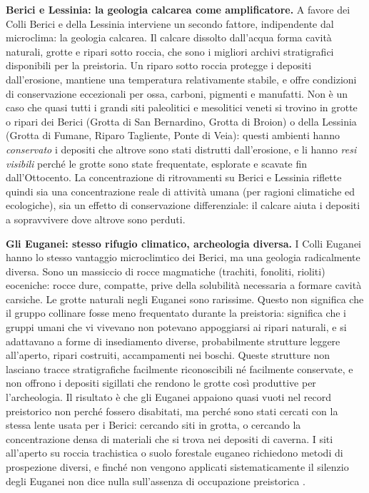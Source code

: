 \medskip
\noindent\textbf{Berici e Lessinia: la geologia calcarea come amplificatore.}
A favore dei Colli Berici e della Lessinia interviene un secondo fattore, indipendente dal microclima: la geologia calcarea. Il calcare dissolto dall'acqua forma cavità naturali, grotte e ripari sotto roccia, che sono i migliori archivi stratigrafici disponibili per la preistoria. Un riparo sotto roccia protegge i depositi dall'erosione, mantiene una temperatura relativamente stabile, e offre condizioni di conservazione eccezionali per ossa, carboni, pigmenti e manufatti. Non è un caso che quasi tutti i grandi siti paleolitici e mesolitici veneti si trovino in grotte o ripari dei Berici (Grotta di San Bernardino, Grotta di Broion) o della Lessinia (Grotta di Fumane, Riparo Tagliente, Ponte di Veia): questi ambienti hanno \textit{conservato} i depositi che altrove sono stati distrutti dall'erosione, e li hanno \textit{resi visibili} perché le grotte sono state frequentate, esplorate e scavate fin dall'Ottocento. La concentrazione di ritrovamenti su Berici e Lessinia riflette quindi sia una concentrazione reale di attività umana (per ragioni climatiche ed ecologiche), sia un effetto di conservazione differenziale: il calcare aiuta i depositi a sopravvivere dove altrove sono perduti.

\medskip
\noindent\textbf{Gli Euganei: stesso rifugio climatico, archeologia diversa.}
I Colli Euganei hanno lo stesso vantaggio microclimtico dei Berici, ma una geologia radicalmente diversa. Sono un massiccio di rocce magmatiche (trachiti, fonoliti, rioliti) eoceniche: rocce dure, compatte, prive della solubilità necessaria a formare cavità carsiche. Le grotte naturali negli Euganei sono rarissime. Questo non significa che il gruppo collinare fosse meno frequentato durante la preistoria: significa che i gruppi umani che vi vivevano non potevano appoggiarsi ai ripari naturali, e si adattavano a forme di insediamento diverse, probabilmente strutture leggere all'aperto, ripari costruiti, accampamenti nei boschi. Queste strutture non lasciano tracce stratigrafiche facilmente riconoscibili né facilmente conservate, e non offrono i depositi sigillati che rendono le grotte così produttive per l'archeologia. Il risultato è che gli Euganei appaiono quasi vuoti nel record preistorico non perché fossero disabitati, ma perché sono stati cercati con la stessa lente usata per i Berici: cercando siti in grotta, o cercando la concentrazione densa di materiali che si trova nei depositi di caverna. I siti all'aperto su roccia trachistica o suolo forestale euganeo richiedono metodi di prospezione diversi, e finché non vengono applicati sistematicamente il silenzio degli Euganei non dice nulla sull'assenza di occupazione preistorica \citep{kaltenrieder2010}.

